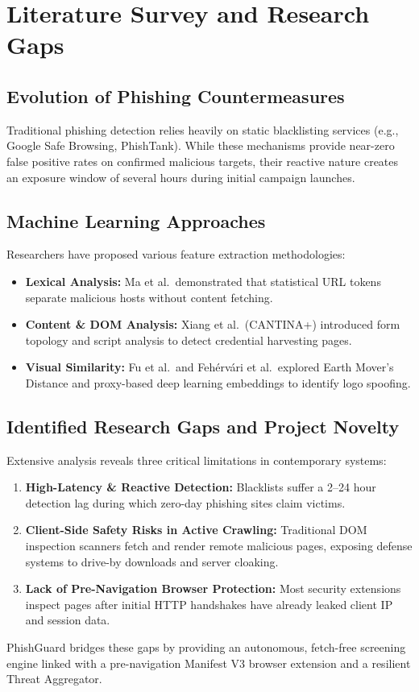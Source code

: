 \documentclass[12pt,a4paper]{report}
\begin{document}
\chapter{Literature Survey and Research Gaps}
\section{Evolution of Phishing Countermeasures}
Traditional phishing detection relies heavily on static blacklisting services (e.g., Google Safe Browsing, PhishTank). While these mechanisms provide near-zero false positive rates on confirmed malicious targets, their reactive nature creates an exposure window of several hours during initial campaign launches.

\section{Machine Learning Approaches}
Researchers have proposed various feature extraction methodologies:
\begin{itemize}
    \item \textbf{Lexical Analysis:} Ma et al.\ demonstrated that statistical URL tokens separate malicious hosts without content fetching.
    \item \textbf{Content \& DOM Analysis:} Xiang et al.\ (CANTINA+) introduced form topology and script analysis to detect credential harvesting pages.
    \item \textbf{Visual Similarity:} Fu et al.\ and Fehérvári et al.\ explored Earth Mover's Distance and proxy-based deep learning embeddings to identify logo spoofing.
\end{itemize}

\section{Identified Research Gaps and Project Novelty}
Extensive analysis reveals three critical limitations in contemporary systems:
\begin{enumerate}
    \item \textbf{High-Latency \& Reactive Detection:} Blacklists suffer a 2--24 hour detection lag during which zero-day phishing sites claim victims.
    \item \textbf{Client-Side Safety Risks in Active Crawling:} Traditional DOM inspection scanners fetch and render remote malicious pages, exposing defense systems to drive-by downloads and server cloaking.
    \item \textbf{Lack of Pre-Navigation Browser Protection:} Most security extensions inspect pages after initial HTTP handshakes have already leaked client IP and session data.
\end{enumerate}
PhishGuard bridges these gaps by providing an autonomous, fetch-free screening engine linked with a pre-navigation Manifest V3 browser extension and a resilient Threat Aggregator.
\end{document}
